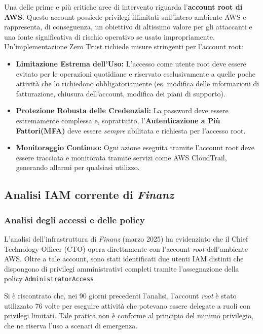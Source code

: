 Una delle prime e più critiche aree di intervento riguarda l'\textbf{account root di AWS}. Questo account possiede privilegi illimitati sull'intero ambiente AWS e rappresenta, di conseguenza, un obiettivo di altissimo valore per gli attaccanti e una fonte significativa di rischio operativo se usato impropriamente. Un'implementazione Zero Trust richiede misure stringenti per l'account root:
\begin{itemize}
    \item \textbf{Limitazione Estrema dell'Uso:} L'accesso come utente root deve essere evitato per le operazioni quotidiane e riservato esclusivamente a quelle poche attività che lo richiedono obbligatoriamente (es. modifica delle informazioni di fatturazione, chiusura dell'account, modifica dei piani di supporto).
    \item \textbf{Protezione Robusta delle Credenziali:} La password deve essere estremamente complessa e, soprattutto, l'\textbf{Auten\allowbreak{}ticazione a Più Fattori\allowbreak{}(MFA)} deve essere \textit{sempre} abilitata e richiesta per l'accesso root.
    \item \textbf{Monitoraggio Continuo:} Ogni azione eseguita tramite l'account root deve essere tracciata e monitorata tramite servizi come AWS CloudTrail, generando allarmi per qualsiasi utilizzo.
\end{itemize}


\subsection{Analisi IAM corrente di \emph{Finanz}}
\label{subsec:analisi_iam_finanz}

\subsubsection*{Analisi degli accessi e delle policy}
L'analisi dell'infrastruttura di \emph{Finanz} (marzo 2025) ha evidenziato che il Chief Technology Officer (CTO) opera direttamente con l'account \emph{root} dell'ambiente AWS. Oltre a tale account, sono stati identificati due utenti IAM distinti che dispongono di privilegi amministrativi completi tramite l'assegnazione della policy \texttt{AdministratorAccess}.

Si è riscontrato che, nei 90 giorni precedenti l'analisi, l'account \emph{root} è stato utilizzato 76 volte per eseguire attività che potevano essere delegate a ruoli con privilegi limitati.
Tale pratica non è conforme al principio del minimo privilegio, che ne riserva l'uso a scenari di emergenza.

